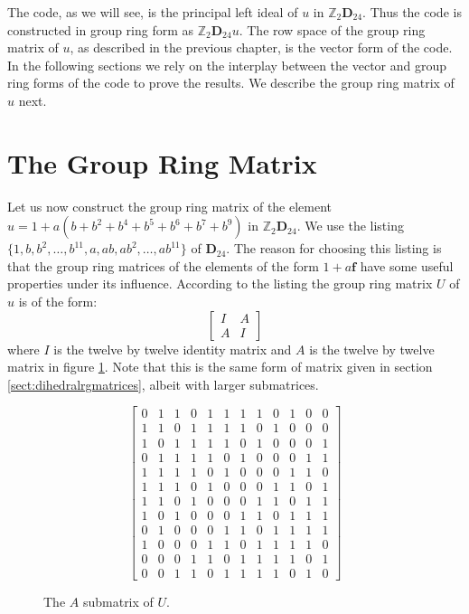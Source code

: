 The code, as we will see, is the principal left ideal of $u$ in $\mathbb{Z}_2 \mathbf{D}_{24}$.
Thus the code is constructed in group ring form as $\mathbb{Z}_2 \mathbf{D}_{24} u$.
The row space of the group ring matrix of $u$, as described in the previous chapter, is the vector form of the code.
In the following sections we rely on the interplay between the vector and group ring forms of the code to prove the results.
We describe the group ring matrix of $u$ next.

\section{The Group Ring Matrix}
\label{sect:golayrgmatrix}
Let us now construct the group ring matrix of the element $u = 1 + a(b + b^2 + b^4 + b^5 + b^6 + b^7 + b^9)$ in $\mathbb{Z}_2 \mathbf{D}_{24}$.
We use the listing $\{1,b,b^2,\ldots,b^{11},a,ab,ab^2,\ldots,ab^{11}\}$ of  $\mathbf{D}_{24}$.
The reason for choosing this listing is that the group ring matrices of the elements of the form $1+a\mathbf{f}$ have some useful properties under its influence.
According to the listing the group ring matrix $U$ of $u$ is of the form:
\[\left[ \begin{array}{c|c}
I & A \\
\hline
A & I
\end{array} \right] \]
where $I$ is the twelve by twelve identity matrix and $A$ is the twelve by twelve matrix in figure \ref{fig:golayAmat}.
Note that this is the same form of matrix given in section \ref{sect:dihedralrgmatrices}, albeit with larger submatrices.
\begin{figure}
\begin{center}
\[ \left[ \begin{array}{cccccccccccc}
0 & 1 & 1 & 0 & 1 & 1 & 1 & 1 & 0 & 1 & 0 & 0 \\
1 & 1 & 0 & 1 & 1 & 1 & 1 & 0 & 1 & 0 & 0 & 0 \\
1 & 0 & 1 & 1 & 1 & 1 & 0 & 1 & 0 & 0 & 0 & 1 \\
0 & 1 & 1 & 1 & 1 & 0 & 1 & 0 & 0 & 0 & 1 & 1 \\
1 & 1 & 1 & 1 & 0 & 1 & 0 & 0 & 0 & 1 & 1 & 0 \\
1 & 1 & 1 & 0 & 1 & 0 & 0 & 0 & 1 & 1 & 0 & 1 \\
1 & 1 & 0 & 1 & 0 & 0 & 0 & 1 & 1 & 0 & 1 & 1 \\
1 & 0 & 1 & 0 & 0 & 0 & 1 & 1 & 0 & 1 & 1 & 1 \\
0 & 1 & 0 & 0 & 0 & 1 & 1 & 0 & 1 & 1 & 1 & 1 \\
1 & 0 & 0 & 0 & 1 & 1 & 0 & 1 & 1 & 1 & 1 & 0 \\
0 & 0 & 0 & 1 & 1 & 0 & 1 & 1 & 1 & 1 & 0 & 1 \\
0 & 0 & 1 & 1 & 0 & 1 & 1 & 1 & 1 & 0 & 1 & 0
\end{array} \right] \]
\caption{The $A$ submatrix of $U$.}
\label{fig:golayAmat}
\end{center}
\end{figure}
